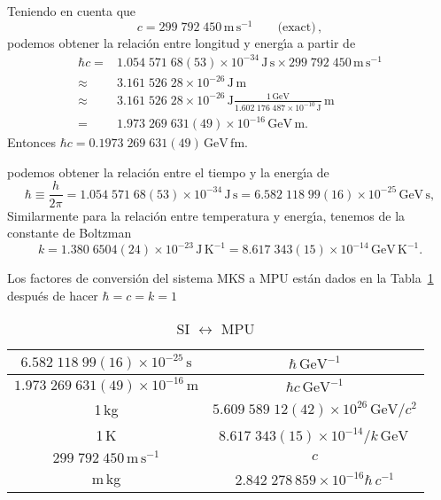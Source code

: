 \begin{frame}
Teniendo en cuenta que \cite{PDG}
\begin{equation}
    c=299\;792\;450\,\text{m}\,\text{s}^{-1}\qquad\text{(exact)}\,,
\end{equation}
podemos obtener la relaci\'on entre longitud y energ\'\i a a partir de
\begin{align}
  \hbar c=&1.054\;571\;68(53)\times10^{-34}\,\text{J}\,\text{s}\times299\;792\;450\,\text{m}\,\text{s}^{-1} \nonumber\\
  \approx&3.161\;526\;28\times10^{-26}\,\text{J}\,\text{m}\nonumber\\
  \approx&3.161\;526\;28\times10^{-26}\,{\text{J}}\frac{1\,\text{GeV}}{1.602\;176\;487\times10^{-10}\,\text{J}}\,\text{m}\nonumber\\
  =&1.973\;269\;631(49)\times10^{-16}\,\text{GeV}\,\text{m}.
\end{align}
Entonces $\hbar c =0.1973\;269\;631(49)\,\text{GeV}\,\text{fm}$.

podemos obtener la relaci\'on entre el tiempo y la energ\'\i a de
\begin{equation}
  \hbar\equiv\frac{h}{2\pi}=1.054\;571\;68(53)\times10^{-34}\,\text{J}\,\text{s}
  =6.582\;118\;99(16)\times10^{-25}\,\text{GeV}\,\text{s},
\end{equation}
Similarmente para la relaci\'on entre temperatura y energ\'\i a, tenemos de la constante de Boltzman
\begin{equation}
  k=1.380\;6504(24)\times10^{-23}\,\text{J}\,\text{K}^{-1}=8.617\;343(15)\times10^{-14}\,\text{GeV}\,\text{K}^{-1}.
\end{equation}


Los factores de conversi\'on del sistema MKS a MPU están dados en la Tabla~\ref{tab:mks2mpu} despu\'es de hacer $\hbar=c=k=1$

\begin{table} %
  \centering %
  \begin{tabular}{c|c} %
$6.582\;118\;99(16)\times10^{-25}\,\text{s}$ & $ {\hbar}\,\text{GeV}^{-1}$\\\hline
$1.973\;269\;631(49)\times10^{-16}\,\text{m}$ & $ {\hbar c}\,\text{GeV}^{-1} $\\ \hline
1\,kg& $5.609\;589\;12(42)\times10^{26}\,\text{GeV}/c^2$ \\ \hline
1\,K & $8.617\;343(15)\times10^{-14}/k\,\text{GeV}$\,\\ \hline
$299\;792\;450\,\text{m}\,\text{s}^{-1}$&$c$\\ \hline
m\,kg&$2.842\;278\,859\times10^{-16}\hbar\,c^{-1}$\\ \hline
  \end{tabular} %
  \caption{SI $\leftrightarrow$ MPU} %
  \label{tab:mks2mpu} %
\end{table} %



\end{frame}
